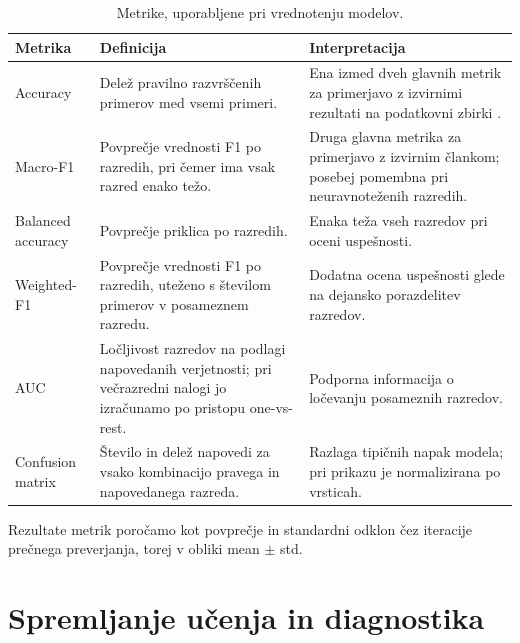 \begin{table}[t]
    \centering
    \caption{Metrike, uporabljene pri vrednotenju modelov.}
    \label{tab:eksperimentalni-protokol-metrike}
    \small
    \begin{tabularx}{\textwidth}{@{}>{\raggedright\arraybackslash}p{} >{\raggedright\arraybackslash}X >{\raggedright\arraybackslash}X@{}}
        \toprule
        Metrika & Definicija & Interpretacija \\
        \midrule
        Accuracy & Delež pravilno razvrščenih primerov med vsemi primeri. & Ena izmed dveh glavnih metrik za primerjavo z izvirnimi rezultati na podatkovni zbirki \MAHNOB{}. \\
        Macro-F1 & Povprečje vrednosti F1 po razredih, pri čemer ima vsak razred enako težo. & Druga glavna metrika za primerjavo z izvirnim člankom; posebej pomembna pri neuravnoteženih razredih. \\
        Balanced accuracy & Povprečje priklica po razredih. & Enaka teža vseh razredov pri oceni uspešnosti. \\
        Weighted-F1 & Povprečje vrednosti F1 po razredih, uteženo s številom primerov v posameznem razredu. & Dodatna ocena uspešnosti glede na dejansko porazdelitev razredov. \\
        AUC & Ločljivost razredov na podlagi napovedanih verjetnosti; pri večrazredni nalogi jo izračunamo po pristopu one-vs-rest. & Podporna informacija o ločevanju posameznih razredov. \\
        Confusion matrix & Število in delež napovedi za vsako kombinacijo pravega in napovedanega razreda. & Razlaga tipičnih napak modela; pri prikazu je normalizirana po vrsticah. \\
        \bottomrule
    \end{tabularx}
\end{table}

Rezultate metrik poročamo kot povprečje in standardni odklon čez iteracije prečnega preverjanja, torej v obliki mean $\pm$ std.

\section{Spremljanje učenja in diagnostika}
\label{subsec:spremljanje-ucenja}

